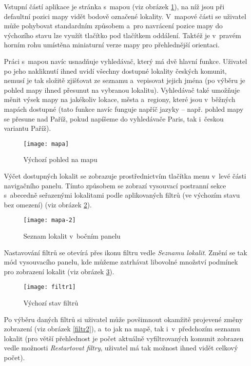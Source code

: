 Vstupní částí aplikace je stránka s~mapou (viz obrázek \ref{mapa}), na níž jsou při defaultní pozici mapy vidět bodově označené lokality. V~mapové části se uživatel může pohybovat standardním způsobem a~pro navrácení pozice mapy do výchozího stavu lze využít tlačítko pod tlačítkem oddálení. Taktéž je v~pravém horním rohu umístěna miniaturní verze mapy pro přehlednější orientaci.

Práci s~mapou navíc usnadňuje vyhledávač, který má dvě hlavní funkce. Uživatel po jeho nakliknutí ihned uvidí všechny dostupné lokality českých komunit, nemusí je tak složitě zjišťovat ze seznamu a~vepisovat jejich jména (po výběru je pohled mapy ihned přesunut na vybranou lokalitu). Vyhledávač také umožňuje měnit výsek mapy na jakékoliv lokace, města a~regiony, které jsou v~běžných mapách dostupné (tato funkce navíc funguje napříč jazyky -- např. pohled mapy se přesune nad Paříž, pokud napíšeme do vyhledávače Paris, tak i~českou variantu Paříž).

\begin{figure}
    \centering
    \texttt{[image: mapa]}  
    \caption{Výchozí pohled na mapu}
    \label{mapa}
\end{figure}

Výčet dostupných lokalit se zobrazuje prostřednictvím tlačítka menu v~levé části navigačního panelu. Tímto způsobem se zobrazí vysouvací postranní sekce s~abecedně seřazenými lokalitami podle aplikovaných filtrů (ve výchozím stavu bez omezení) (viz obrázek \ref{mapa-2}).

\begin{figure}  
    \centering
    \texttt{[image: mapa-2]}  
    \caption{Seznam lokalit v~bočním panelu}
    \label{mapa-2}
\end{figure}

Nastavování filtrů se otevírá přes ikonu filtru vedle \emph{Seznamu lokalit}. Změní se tak mód vysouvacího panelu, kde můžeme zatrhávat libovolné množství podmínek pro zobrazení lokalit (viz obrázek \ref{filtr1}).

\begin{figure}
    \centering
    \texttt{[image: filtr1]} 
    \caption{Výchozí stav filtrů}
    \label{filtr1}
\end{figure}

Po výběru daných filtrů si uživatel může povšimnout okamžitě projevené změny zobrazení (viz obrázek \ref{filtr2}), a~to jak na mapě, tak i~v~předchozím seznamu lokalit (pro větší přehlednost je počet aktuálně vyfiltrovaných komunit zobrazen vedle možnosti \emph{Restartovat filtry}, uživatel má tak možnost ihned vidět celkový počet).

